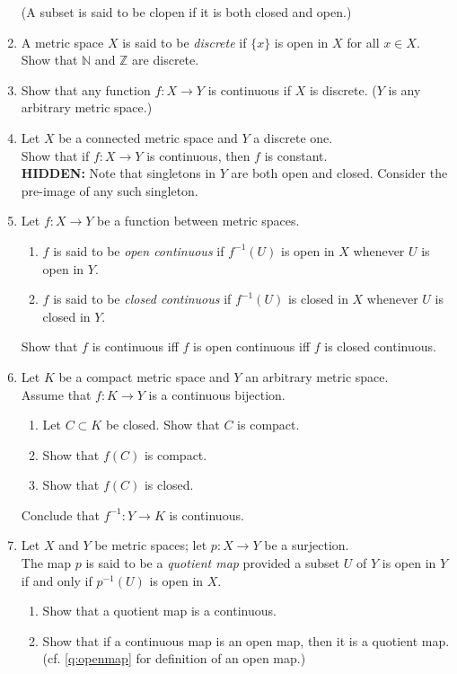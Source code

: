 \documentclass[12pt]{article}
\theoremstyle{definition}
\numberwithin{thm}{section}
\newcommand{\hint}[1]{\textbf{HIDDEN:} {\color[rgb]{0.95, 0.95, 0.95}#1}}
\begin{document}
\begin{enumerate}
	(A subset is said to be clopen if it is both closed and open.)
	\item A metric space $X$ is said to be \emph{discrete} if $\{x\}$ is open in $X$ for all $x \in X.$\\
	Show that $\mathbb{N}$ and $\mathbb{Z}$ are discrete.
	\item Show that any function $f:X \to Y$ is continuous if $X$ is discrete. ($Y$ is any arbitrary metric space.)
	\item Let $X$ be a connected metric space and $Y$ a discrete one.\\
	Show that if $f:X \to Y$ is continuous, then $f$ is constant.\\
	\hint{Note that singletons in $Y$ are both open and closed. Consider the pre-image of any such singleton.}
	\item Let $f:X\to Y$ be a function between metric spaces.
	\begin{enumerate}
		\item $f$ is said to be \emph{open continuous} if $f^{-1}(U)$ is open in $X$ whenever $U$ is open in $Y.$
		\item $f$ is said to be \emph{closed continuous} if $f^{-1}(U)$ is closed in $X$ whenever $U$ is closed in $Y.$
	\end{enumerate}
	Show that $f$ is continuous iff $f$ is open continuous iff $f$ is closed continuous.
	\item Let $K$ be a compact metric space and $Y$ an arbitrary metric space.\\
	Assume that $f:K\to Y$ is a continuous bijection.
	\begin{enumerate}
		\item Let $C \subset K$ be closed. Show that $C$ is compact.
		\item Show that $f(C)$ is compact.
		\item Show that $f(C)$ is closed.
	\end{enumerate}
	Conclude that $f^{-1}:Y \to K$ is continuous.
	\item Let $X$ and $Y$ be metric spaces; let $p: X \to Y$ be a surjection.\\
	The map $p$ is said to be a \emph{quotient map} provided a subset $U$ of $Y$ is open in $Y$ if and only if $p^{-1}(U)$ is open in $X.$
	\begin{enumerate}
		\item Show that a quotient map is a continuous.
		\item Show that if a continuous map is an open map, then it is a quotient map. (cf. \ref{q:openmap} for definition of an open map.)	

\end{enumerate}
\end{enumerate}
\end{document}
